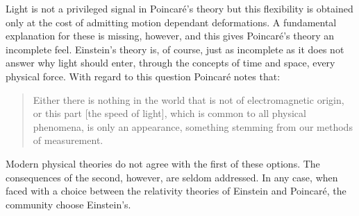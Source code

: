 \documentclass[10pt, fleqn,final,showtrims,oldfontcommands, article,a4paper,oneside]{memoir} %
\newcommand{\aether}{\ae ther}
\newcommand{\Poincare}{Poincar{\'e}\xspace}
\begin{document}
%

Light is not a privileged signal in \Poincare's theory
but this flexibility is obtained only at the cost of admitting  motion dependant deformations.
A fundamental explanation for these is  missing, however,
and this gives \Poincare's theory an incomplete feel.
Einstein's theory is, of course,
just as incomplete as it does not answer why
light should enter, through the concepts of time and space, every physical force.
With regard to this question \Poincare\cite{Poincare1906} notes that:
\begin{quote}
  Either there is nothing in the world that is not of electromagnetic origin,
  or this part [the speed of light], which is common to all physical phenomena,
  is only an appearance, something stemming from our methods of measurement.
\end{quote}
Modern physical theories do not agree with the first of these options.
The consequences of the second, however, 
are seldom addressed.
%
%
In any case, when faced with a choice between the relativity theories of Einstein and \Poincare, the community choose Einstein's.
\end{document}
